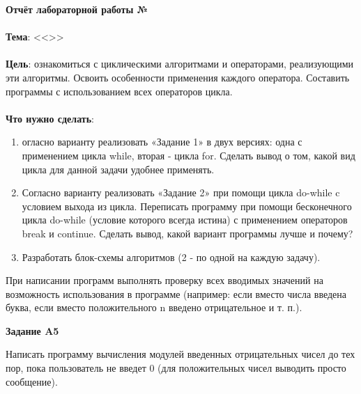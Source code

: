 \documentclass[12pt, a4paper, simple]{eskdtext}
\def \gpiDocTopic {Отчёт лабораторной работы №\gpiDocNum}
\begin{document}



\begin{center}
    \textbf{\gpiDocTopic}
\end{center}

\paragraph{} \textbf{Тема}: <<\gpiTopicRep>>

\paragraph{} \textbf{Цель}:
ознакомиться с циклическими алгоритмами и операторами, реализующими эти алгоритмы.
Освоить особенности применения каждого оператора.
Составить программы с использованием всех операторов цикла.

\paragraph{} \textbf{Что нужно сделать}:

\begin{enumerate}
    \item огласно варианту реализовать «Задание 1» в двух версиях:
    одна с применением цикла while, вторая - цикла for.
    Сделать вывод о том, какой вид цикла для данной задачи удобнее применять.
    \item Согласно варианту реализовать «Задание 2» при помощи цикла do-while c условием выхода из цикла.
    Переписать программу при помощи бесконечного цикла do-while (условие которого всегда истина)
    с применением операторов break и continue.
    Сделать вывод, какой вариант программы лучше и почему?
    \item Разработать блок-схемы алгоритмов (2 - по одной на каждую задачу).
\end{enumerate}

При написании программ выполнять проверку всех вводимых значений на возможность использования в программе
(например: если вместо числа введена буква, если вместо положительного n введено отрицательное и т. п.).

\begin{center}
    \textbf{Задание A5}
\end{center}

Написать программу вычисления модулей введенных отрицательных чисел до тех пор,
пока пользователь не введет 0 (для положительных чисел выводить просто сообщение).
\end{document}
